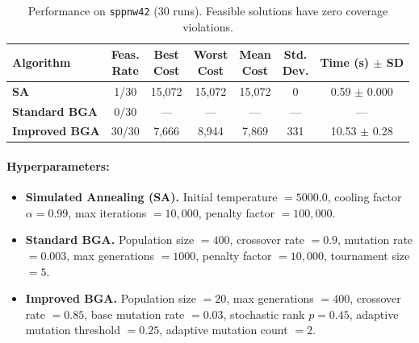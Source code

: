 \documentclass[12pt]{article}
\begin{document}
\begin{table}[htbp]
  \centering
  \label{tab:sppnw42}
  \renewcommand{\arraystretch}{1.1}
  \begin{tabular}{lcccccc}
    \hline
    \textbf{Algorithm} 
      & \makecell{Feas.\\Rate} 
      & \makecell{Best\\Cost} 
      & \makecell{Worst\\Cost} 
      & \makecell{Mean\\Cost} 
      & \makecell{Std.\\Dev.} 
      & \makecell{Time\\(s) $\pm$ SD}\\
    \hline
    \textbf{SA}          
      & 1/30 
      & 15,072
      & 15,072
      & 15,072
      & 0
      & 0.59 $\pm$ 0.000 \\
    \textbf{Standard BGA} 
      & 0/30
      & — 
      & —
      & —
      & —
      & — \\
    \textbf{Improved BGA} 
      & 30/30 
      & 7,666
      & 8,944
      & 7,869
      & 331
      & 10.53 $\pm$ 0.28 \\
    \hline
  \end{tabular}
  \caption{Performance on \texttt{sppnw42} (30 runs). Feasible solutions have zero coverage violations.}
\end{table}

\paragraph{Hyperparameters:}
\vspace{-1.5em}
\begin{itemize}
    \item \textbf{Simulated Annealing (SA).} 
    Initial temperature $= 5000.0$, 
    cooling factor $\alpha = 0.99$, 
    max iterations $= 10{,}000$, 
    penalty factor $= 100{,}000$. 
    \item \textbf{Standard BGA.}
    Population size $= 400$, 
    crossover rate $= 0.9$, 
    mutation rate $= 0.003$, 
    max generations $= 1000$, 
    penalty factor $= 10{,}000$, 
    tournament size $= 5$. 
    \item \textbf{Improved BGA.}
    Population size $= 20$, 
    max generations $= 400$, 
    crossover rate $= 0.85$, 
    base mutation rate $= 0.03$, 
    stochastic rank $p = 0.45$, 
    adaptive mutation threshold $= 0.25$, 
    adaptive mutation count $= 2$.
\end{itemize}
\end{document}
